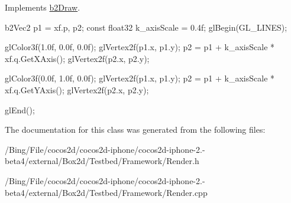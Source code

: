 Implements \hyperlink{classb2_draw_ade698123482a491a7a61fa1fe4d3a4f4}{b2\-Draw}.


\begin{DoxyCode}
{
        b2Vec2 p1 = xf.p, p2;
        const float32 k_axisScale = 0.4f;
        glBegin(GL_LINES);
        
        glColor3f(1.0f, 0.0f, 0.0f);
        glVertex2f(p1.x, p1.y);
        p2 = p1 + k_axisScale * xf.q.GetXAxis();
        glVertex2f(p2.x, p2.y);

        glColor3f(0.0f, 1.0f, 0.0f);
        glVertex2f(p1.x, p1.y);
        p2 = p1 + k_axisScale * xf.q.GetYAxis();
        glVertex2f(p2.x, p2.y);

        glEnd();
}
\end{DoxyCode}


The documentation for this class was generated from the following files\-:\begin{DoxyCompactItemize}
\item 
/\-Bing/\-File/cocos2d/cocos2d-\/iphone/cocos2d-\/iphone-\/2.-\/beta4/external/\-Box2d/\-Testbed/\-Framework/Render.\-h\item 
/\-Bing/\-File/cocos2d/cocos2d-\/iphone/cocos2d-\/iphone-\/2.-\/beta4/external/\-Box2d/\-Testbed/\-Framework/Render.\-cpp\end{DoxyCompactItemize}
